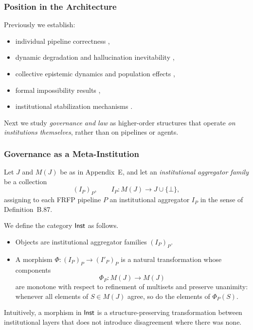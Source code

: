

\subsubsection{Position in the Architecture}

Previously we establish:

\begin{itemize}
\item individual pipeline correctness  ,
\item dynamic degradation and hallucination inevitability  ,
\item collective epistemic dynamics and population effects  ,
\item formal impossibility results  ,
\item institutional stabilization mechanisms .
\end{itemize}

Next we study \emph{governance and law} as higher-order structures that
operate \emph{on institutions themselves}, rather than on pipelines or agents.

\subsubsection{Governance as a Meta-Institution}
\label{sec:appendix-F1}

Let $J$ and $M(J)$ be as in Appendix~E, and let an \emph{institutional aggregator family} be a collection
\[
  (I_P)_P, \qquad I_P : M(J) \to J \cup \{\bot\},
\]
assigning to each FRFP pipeline $P$ an institutional aggregator $I_P$ in the sense of Definition~B.87.

\begin{definition}\label{def:F1-Inst}
We define the category $\mathsf{Inst}$ as follows.
\begin{itemize}
  \item Objects are institutional aggregator families $(I_P)_P$.
  \item A morphism $\Phi : (I_P)_P \to (I'_P)_P$ is a natural transformation whose components
  \[
    \Phi_P : M(J) \to M(J)
  \]
  are monotone with respect to refinement of multisets and preserve unanimity: whenever all elements of $S \in M(J)$ agree, so do the elements of $\Phi_P(S)$.
\end{itemize}
Intuitively, a morphism in $\mathsf{Inst}$ is a structure-preserving transformation between institutional layers that does not introduce disagreement where there was none.
\end{definition}

